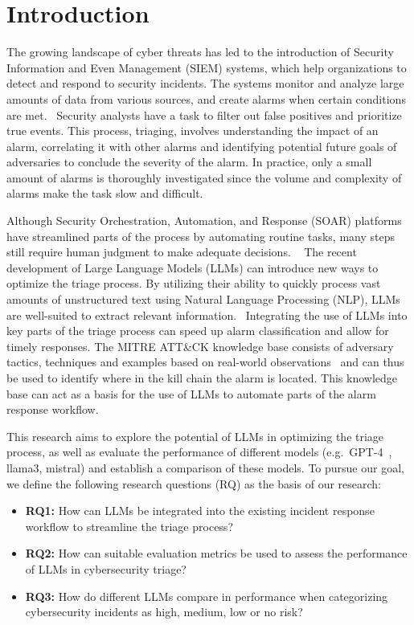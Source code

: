 \section{Introduction}
\label{sec:introduction}

The growing landscape of cyber threats has led to the introduction of Security Information and Even Management (SIEM)
systems, which help organizations to detect and respond to security incidents.
The systems monitor and analyze large amounts of data from various sources, and create alarms when certain conditions
are met.\ \citep{ibmsiem}
Security analysts have a task to filter out false positives and prioritize true events.
This process, triaging, involves understanding the impact of an alarm, correlating it with other alarms and identifying
potential future goals of adversaries to conclude the severity of the alarm.
In practice, only a small amount of alarms is thoroughly investigated since the volume and complexity of alarms make
the task slow and difficult.\ \citep{chen2024elevating}

Although Security Orchestration, Automation, and Response (SOAR) platforms have streamlined parts of the process by
automating routine tasks, many steps still require human judgment to make adequate decisions.
\ \citep{chuvakin2019triaging}
The recent development of Large Language Models (LLMs) can introduce new ways to optimize the triage process.
By utilizing their ability to quickly process vast amounts of unstructured text using Natural Language Processing (NLP),
LLMs are well-suited to extract relevant information.\ \citep{chaudhary2024ai}
Integrating the use of LLMs into key parts of the triage process can speed up alarm classification and allow for timely
responses.
The MITRE ATT\&CK knowledge base consists of adversary tactics, techniques and examples based on real-world
observations\ \citep{strom2018mitre} and can thus be used to identify where in the kill chain the alarm is located.
This knowledge base can act as a basis for the use of LLMs to automate parts of the alarm response workflow.

This research aims to explore the potential of LLMs in optimizing the triage process, as well as evaluate the
performance of different models (e.g.\ GPT-4\ \citep{achiam2023gpt}, llama3, mistral) and establish a comparison of
these models.
To pursue our goal, we define the following research questions (RQ) as the basis of our research:

\begin{itemize}
    \item \textbf{RQ1:} How can LLMs be integrated into the existing incident response workflow to streamline the triage process?
    \item \textbf{RQ2:} How can suitable evaluation metrics be used to assess the performance of LLMs in cybersecurity triage?
    \item \textbf{RQ3:} How do different LLMs compare in performance when categorizing cybersecurity incidents as high, medium, low or no risk?
\end{itemize}

